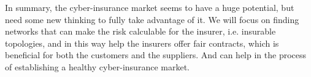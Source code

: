 In summary, the cyber-insurance market seems to have a huge potential, but need some new thinking to fully take advantage of it. We will focus on finding networks that can make the risk calculable for the insurer, i.e. insurable topologies, and in this way help the insurers offer fair contracts, which is beneficial for both the customers and the suppliers. And can help in the process of establishing a healthy cyber-insurance market.

   
   
   
   
   
   
   
  

